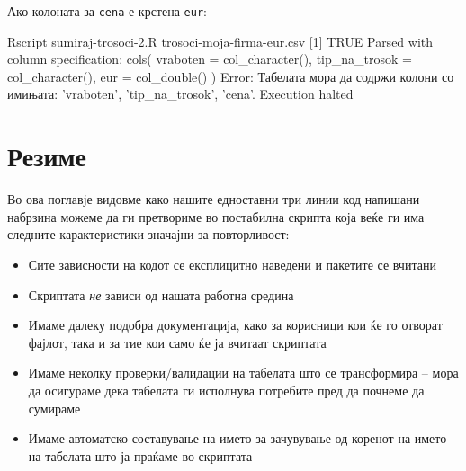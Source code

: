 \documentclass[
]{book}
\newenvironment{Shaded}{\begin{snugshade}}{\end{snugshade}}
\newcommand{\ExtensionTok}[1]{#1}
\newcommand{\NormalTok}[1]{#1}
\newcommand{\StringTok}[1]{\textcolor[rgb]{0.31,0.60,0.02}{#1}}
\providecommand{\tightlist}{%
  \setlength{\itemsep}{0pt}\setlength{\parskip}{0pt}}
\begin{document}
Ако колоната за \texttt{cena} е крстена \texttt{eur}:

\begin{Shaded}
\begin{Highlighting}[]
\ExtensionTok{Rscript}\NormalTok{ sumiraj-trosoci-2.R trosoci-moja-firma-eur.csv}
\NormalTok{[}\ExtensionTok{1}\NormalTok{] TRUE}
\ExtensionTok{Parsed}\NormalTok{ with column specification:}
\ExtensionTok{cols}\NormalTok{(}
  \ExtensionTok{vraboten}\NormalTok{ = col_character(),}
  \ExtensionTok{tip_na_trosok}\NormalTok{ = col_character(),}
  \ExtensionTok{eur}\NormalTok{ = col_double()}
\NormalTok{)}
\ExtensionTok{Error}\NormalTok{: Табелата мора да содржи колони со имињата: }\StringTok{'vraboten'}\NormalTok{, }\StringTok{'tip_na_trosok'}\NormalTok{, }\StringTok{'cena'}\NormalTok{.}
\ExtensionTok{Execution}\NormalTok{ halted}
\end{Highlighting}
\end{Shaded}

\hypertarget{ux440ux435ux437ux438ux43cux435}{%
\section{Резиме}\label{ux440ux435ux437ux438ux43cux435}}

Во ова поглавје видовме како нашите едноставни три линии код напишани набрзина можеме да ги претвориме во постабилна скрипта која веќе ги има следните карактеристики значајни за повторливост:

\begin{itemize}
\tightlist
\item
  Сите зависности на кодот се експлицитно наведени и пакетите се вчитани\\
\item
  Скриптата \emph{не} зависи од нашата работна средина\\
\item
  Имаме далеку подобра документација, како за корисници кои ќе го отворат фајлот, така и за тие кои само ќе ја вчитаат скриптата\\
\item
  Имаме неколку проверки/валидации на табелата што се трансформира -- мора да осигураме дека табелата ги исполнува потребите пред да почнеме да сумираме\\
\item
  Имаме автоматско составување на името за зачувување од коренот на името на табелата што ја праќаме во скриптата
\end{itemize}
\end{document}
